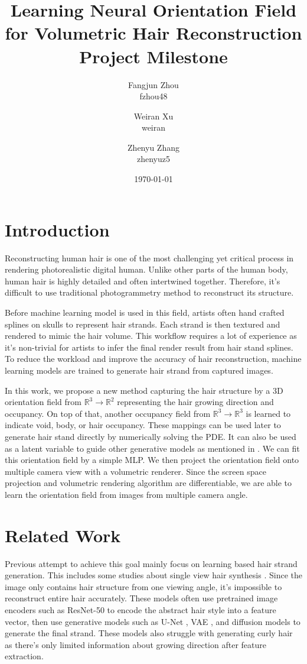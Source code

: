 \documentclass[12pt]{article}
\title{
  Learning Neural Orientation Field for Volumetric Hair Reconstruction \\
  {
    \small
    Project Milestone
  }
}
\author{
  Fangjun Zhou \\ fzhou48
  \and Weiran Xu \\ weiran
  \and Zhenyu Zhang \\ zhenyuz5
}
\date{\today}
\begin{document}
  \maketitle

  \section{Introduction}

  Reconstructing human hair is one of the most challenging yet critical process in rendering photorealistic digital human. Unlike other parts of the human body, human hair is highly detailed and often intertwined together. Therefore, it's difficult to use traditional photogrammetry method to reconstruct its structure.

  Before machine learning model is used in this field, artists often hand crafted splines on skulls to represent hair strands. Each strand is then textured and rendered to mimic the hair volume. This workflow requires a lot of experience as it's non-trivial for artists to infer the final render result from hair stand splines. To reduce the workload and improve the accuracy of hair reconstruction, machine learning models are trained to generate hair strand from captured images.

  In this work, we propose a new method capturing the hair structure by a 3D orientation field from $\mathbb{R}^{3} \rightarrow \mathbb{R}^{2}$ representing the hair growing direction and occupancy. On top of that, another occupancy field from $\mathbb{R}^{3} \rightarrow \mathbb{R}^{3}$ is learned to indicate void, body, or hair occupancy. These mappings can be used later to generate hair stand directly by numerically solving the PDE. It can also be used as a latent variable to guide other generative models as mentioned in \cite{metzer_latent-nerf_2022}. We can fit this orientation field by a simple MLP. We then project the orientation field onto multiple camera view with a volumetric renderer. Since the screen space projection and volumetric rendering algorithm are differentiable, we are able to learn the orientation field from images from multiple camera angle.

  \section{Related Work}

  Previous attempt to achieve this goal mainly focus on learning based hair strand generation. This includes some studies about single view hair synthesis \cite{saito_3d_2018, zheng_hairstep_2023, wu_neuralhdhair_2022, ma_single-view_nodate}. Since the image only contains hair structure from one viewing angle, it's impossible to reconstruct entire hair accurately. These models often use pretrained image encoders such as ResNet-50 \cite{saito_3d_2018} to encode the abstract hair style into a feature vector, then use generative models such as U-Net \cite{zheng_hairstep_2023}, VAE \cite{saito_3d_2018}, and diffusion models \cite{sklyarova_neural_2023} to generate the final strand. These models also struggle with generating curly hair as there's only limited information about growing direction after feature extraction.
\end{document}
